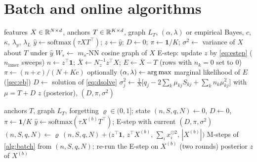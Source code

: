 \section{Batch and online algorithms}
\begin{algorithm}[h]
\caption{\method, batch (transductive) inference}
\label{alg:batch}
\begin{algorithmic}[1]
\Require features $X\in\mathbb{R}^{N\times d}$, anchors $T\in\mathbb{R}^{K\times d}$, graph $L_T$, $(\alpha,\lambda)$ or empirical Bayes, $c$, $\kappa$, $\lambda_y$, $\lambda_L$
\State $\hat{y}\gets\mathrm{softmax}(\tau XT^{\top})$; $z\gets\hat{y}$; $D\gets 0$; $\pi\gets\mathbf{1}/K$; $\sigma^2\gets$ variance of $X$ about $T$ under $\hat{y}$
\State $W_s\gets$ $m_s$-NN cosine graph of $X$
  \State E-step: update $z$ by \cref{eq:estep} ($n_{\mathrm{inner}}$ sweeps)
  \State $n\gets z^{\top}\mathbf{1}$;\; $\bar{X}\gets N_z^{-1}z^{\top}X$;\; $E\gets\bar{X}-T$ (rows with $n_k=0$ set to $0$)
  \State $\pi\gets(n+c)/(N+Kc)$ 
  \State optionally $(\alpha,\lambda)\gets\operatorname*{arg\,max}$ marginal likelihood of $E$ (\cref{sec:eb})
  \State $D\gets$ solution of \cref{eq:dsolve} 
  \State $\sigma_j^2\gets\tfrac{1}{N}\big[q_j - 2\sum_k\mu_{kj}S_{kj} + \sum_k n_k\mu_{kj}^2\big]$ with $\mu=T+D$
\EndFor
\State \Return $z$ (posterior), $(D,\pi,\sigma^2)$
\end{algorithmic}
\end{algorithm}

\begin{algorithm}[h]
\caption{\method, online inference on a stream}
\label{alg:online}
\begin{algorithmic}[1]
\Require anchors $T$, graph $L_T$, forgetting $\varrho\in(0,1]$; state $(n,S,q,N)\gets 0$, $D\gets 0$, $\pi\gets\mathbf{1}/K$
  \State $\hat{y}\gets\mathrm{softmax}(\tau X^{(b)}T^{\top})$; E-step with current $(D,\pi,\sigma^2)$ 
  \State $(n,S,q,N)\gets\varrho\,(n,S,q,N) + \big(z^{\top}\mathbf{1},\, z^{\top}X^{(b)},\, \textstyle\sum_i x_i^{\odot2},\, |X^{(b)}|\big)$
  \State M-steps of \cref{alg:batch} from $(n,S,q,N)$; re-run the E-step on $X^{(b)}$ (two rounds)
  \State \Return posterior $z$ of $X^{(b)}$
\EndFor
\end{algorithmic}
\end{algorithm}

